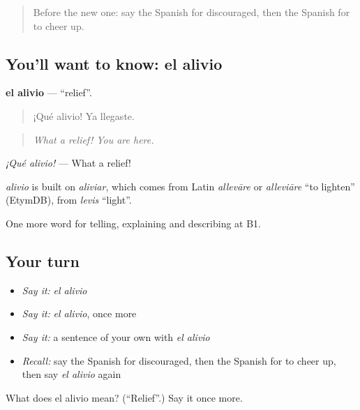 \label{lesson:ES-C712-alivio}



\begin{quote}
Before the new one: say the Spanish for discouraged, then the Spanish for to cheer up.
\end{quote}

\subsection*{You'll want to know: el alivio}
\textbf{el alivio} — \textquotedblleft{}relief\textquotedblright{}.

\begin{quote}
¡Qué alivio! Ya llegaste.
\end{quote}

\begin{quote}
\emph{What a relief! You are here.}
\end{quote}

\emph{¡Qué alivio!} — What a relief!

\begin{cousinweb}
\emph{alivio} is built on \emph{aliviar}, which comes from Latin \emph{allevāre} or \emph{alleviāre} \textquotedblleft{}to lighten\textquotedblright{} (EtymDB), from \emph{levis} \textquotedblleft{}light\textquotedblright{}.
\end{cousinweb}

\begin{grammarlens}[title={What you've built}]
One more word for telling, explaining and describing at B1.
\end{grammarlens}

\subsection*{Your turn}
\begin{itemize}
\raggedright
  \item \emph{Say it:} \emph{el alivio}
  \item \emph{Say it:} \emph{el alivio}, once more
  \item \emph{Say it:} a sentence of your own with \emph{el alivio}
  \item \emph{Recall:} say the Spanish for discouraged, then the Spanish for to cheer up, then say \emph{el alivio} again
\end{itemize}

\begin{tcolorbox}[breakable,colback=teal!4,colframe=teal!35!black,title={Before you move on}]
What does el alivio mean? (\textquotedblleft{}Relief\textquotedblright{}.) Say it once more.
\end{tcolorbox}
